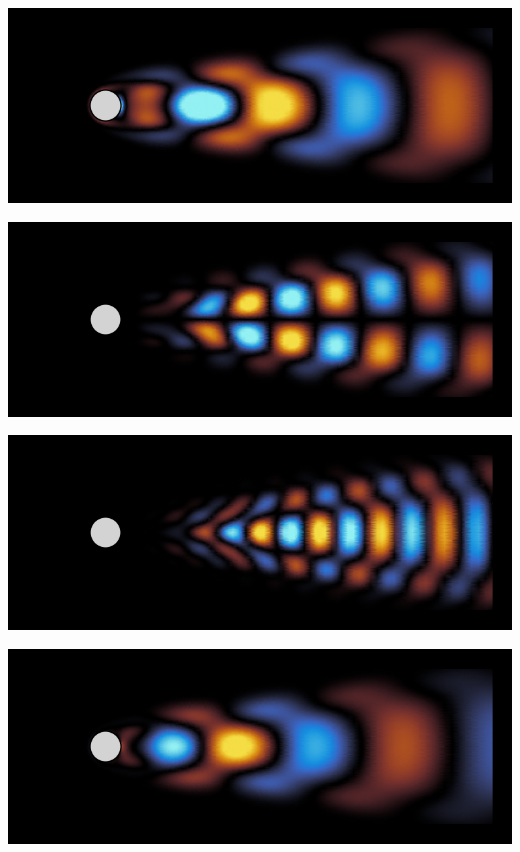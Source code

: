 \documentclass[aspectratio=169, usenames, dvipsnames]{beamer}
\begin{document}
\begin{frame}%
  \vfill

  \begin{minipage}{.48\textwidth}
    \includegraphics[width=\textwidth]{POD_modes_1}

    \vfill
    
    \includegraphics[width=\textwidth]{POD_modes_3}

    \vfill
    
    \includegraphics[width=\textwidth]{POD_modes_5}
  \end{minipage}%
  \hfill
  \begin{minipage}{.48\textwidth} 
    \includegraphics[width=\textwidth]{POD_modes_2}


\end{minipage}
\end{frame}
\end{document}
